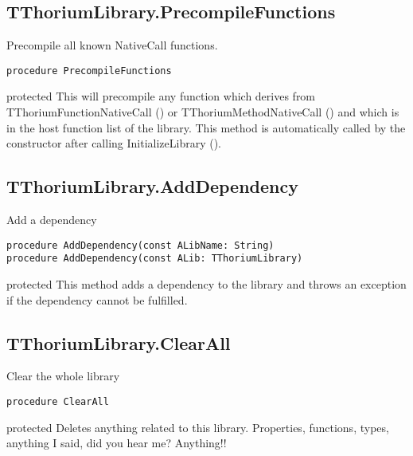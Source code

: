 \subsection{TThoriumLibrary.PrecompileFunctions}
\label{thoriumcorepkg:thorium:tthoriumlibrary:precompilefunctions}
\begin{FPCList}
\Synopsis
Precompile all known NativeCall functions.\Declaration 

\begin{verbatim}
procedure PrecompileFunctions
\end{verbatim}
\Visibility
protected
\Description
This will precompile any function which derives from TThoriumFunctionNativeCall (\pageref{thoriumcorepkg:thorium}) or TThoriumMethodNativeCall (\pageref{thoriumcorepkg:thorium}) and which is in the host function list of the library. This method is automatically called by the constructor after calling InitializeLibrary (\pageref{thoriumcorepkg:thorium:tthoriumlibrary:initializelibrary}).\end{FPCList}
\subsection{TThoriumLibrary.AddDependency}
\label{thoriumcorepkg:thorium:tthoriumlibrary:adddependency}
\begin{FPCList}
\Synopsis
Add a dependency\Declaration 

\begin{verbatim}
procedure AddDependency(const ALibName: String)
procedure AddDependency(const ALib: TThoriumLibrary)
\end{verbatim}
\Visibility
protected
\Description
This method adds a dependency to the library and throws an exception if the dependency cannot be fulfilled.\end{FPCList}
\subsection{TThoriumLibrary.ClearAll}
\label{thoriumcorepkg:thorium:tthoriumlibrary:clearall}
\begin{FPCList}
\Synopsis
Clear the whole library\Declaration 

\begin{verbatim}
procedure ClearAll
\end{verbatim}
\Visibility
protected
\Description
Deletes anything related to this library. Properties, functions, types, anything I said, did you hear me? Anything!!\end{FPCList}
